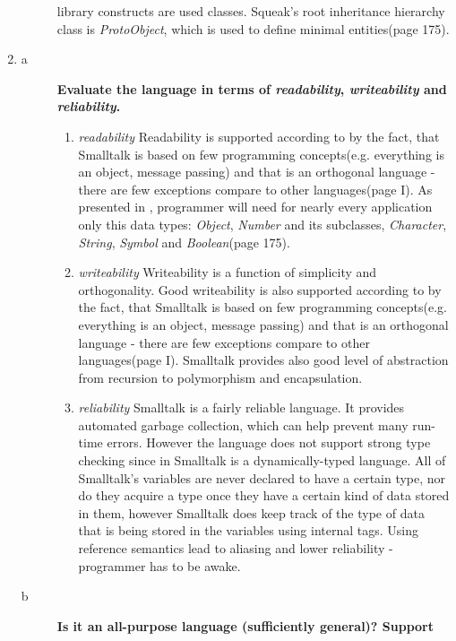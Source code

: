 \documentclass[5pt]{article}
\begin{document}
\begin{enumerate}
\begin{description}
  library constructs are used classes. Squeak's root inheritance hierarchy class is
  \textit{ProtoObject}, which is used to define minimal entities(page 175).
  \end{description}
  \item
  \begin{description}
  \item[a]\textbf{Evaluate the language in terms of \textit{readability},
  \textit{writeability} and \textit{reliability}.}
  \begin{enumerate}
    \item \textit{readability} Readability is supported according to
    \cite{gokel:comp_prog_using_gnu_smalltalk} by the fact, that Smalltalk is
    based on few programming concepts(e.g. everything is an object, message
    passing) and that is an orthogonal language - there are few exceptions
    compare to other languages(page I). As presented in
    \cite{black:squeak_by_example}, programmer will need for nearly every
    application only this data types: \textit{Object}, \textit{Number} and its
    subclasses, \textit{Character}, \textit{String}, \textit{Symbol} and
    \textit{Boolean}(page 175).
    \item \textit{writeability} Writeability is a function of simplicity and
    orthogonality. Good writeability is also supported according to
    \cite{gokel:comp_prog_using_gnu_smalltalk} by the fact, that Smalltalk is
    based on few programming concepts(e.g. everything is an object, message
    passing) and that is an orthogonal language - there are few exceptions
    compare to other languages(page I). Smalltalk provides also good level of
    abstraction from recursion to polymorphism and encapsulation.
    \item \textit{reliability} Smalltalk is a fairly reliable language. It
    provides automated garbage collection, which can help prevent many run-time errors. However the language
does not support strong type checking since in Smalltalk is a dynamically-typed
language. All of Smalltalk’s variables are never declared to have a certain type, nor do they acquire a type
once they have a certain kind of data stored in them, however Smalltalk does keep track
of the type of data that is being stored in the variables using internal tags.
Using reference semantics lead to aliasing and lower reliability - programmer
has to be awake.
  \end{enumerate}
  \item[b]\textbf{Is it an all-purpose language (sufficiently general)? Support
}
\end{description}
\end{enumerate}
\end{document}
